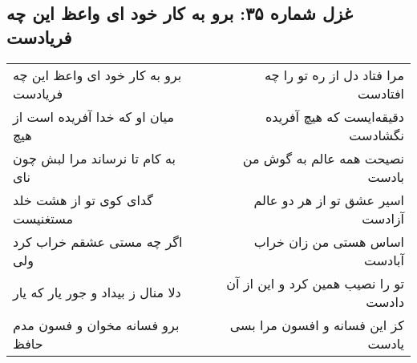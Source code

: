 \begin{center}
\section*{غزل شماره ۳۵: برو به کار خود ای واعظ این چه فریادست}
\label{sec:sh035}
\begin{longtable}{l p{0.5cm} r}
برو به کار خود ای واعظ این چه فریادست
&&
مرا فتاد دل از ره تو را چه افتادست
\\
میان او که خدا آفریده است از هیچ
&&
دقیقه‌ایست که هیچ آفریده نگشادست
\\
به کام تا نرساند مرا لبش چون نای
&&
نصیحت همه عالم به گوش من بادست
\\
گدای کوی تو از هشت خلد مستغنیست
&&
اسیر عشق تو از هر دو عالم آزادست
\\
اگر چه مستی عشقم خراب کرد ولی
&&
اساس هستی من زان خراب آبادست
\\
دلا منال ز بیداد و جور یار که یار
&&
تو را نصیب همین کرد و این از آن دادست
\\
برو فسانه مخوان و فسون مدم حافظ
&&
کز این فسانه و افسون مرا بسی یادست
\\
\end{longtable}
\end{center}
